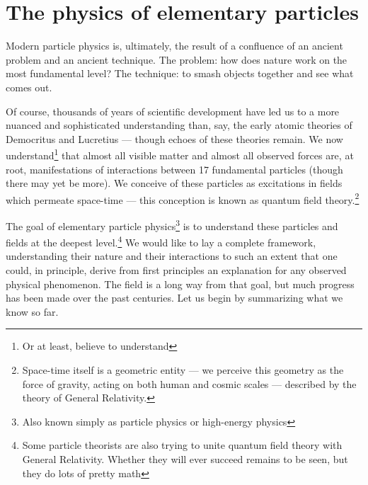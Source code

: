 \documentclass[../thesis.tex]{subfiles}
\begin{document}
\section{The physics of elementary particles}
	Modern particle physics is, ultimately, the result of a confluence of an ancient problem and an ancient technique. The problem: how does nature work on the most fundamental level? The technique: to smash objects together and see what comes out. 

	Of course, thousands of years of scientific development have led us to a more nuanced and sophisticated understanding than, say, the early atomic theories of Democritus and Lucretius --- though echoes of these theories remain. We now understand\footnote{Or at least, believe to understand} that almost all visible matter and almost all observed forces are, at root, manifestations of interactions between 17 fundamental particles (though there may yet be more). We conceive of these particles as excitations in fields which permeate space-time --- this conception is known as quantum field theory.\footnote{Space-time itself is a geometric entity --- we perceive this geometry as the force of gravity, acting on both human and cosmic scales --- described by the theory of General Relativity.}

	The goal of elementary particle physics\footnote{Also known simply as particle physics or high-energy physics} is to understand these particles and fields at the deepest level.\footnote{Some particle theorists are also trying to unite quantum field theory with General Relativity. Whether they will ever succeed remains to be seen, but they do lots of pretty math} We would like to lay a complete framework, understanding their nature and their interactions to such an extent that one could, in principle, derive from first principles an explanation for any observed physical phenomenon. The field is a long way from that goal, but much progress has been made over the past centuries. Let us begin by summarizing what we know so far.
\end{document}

